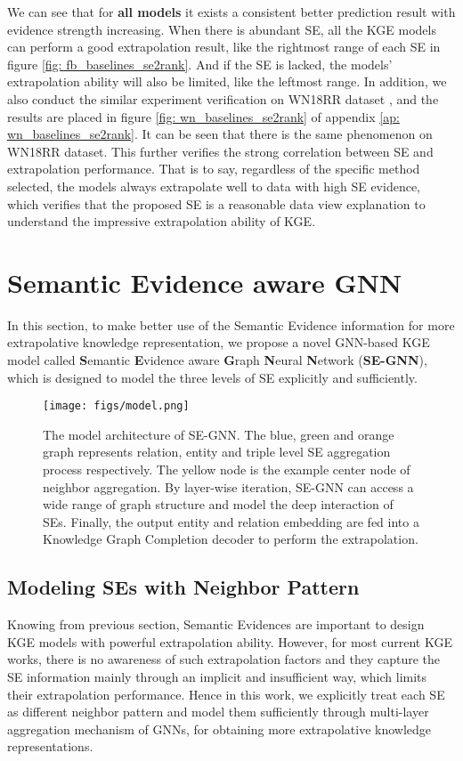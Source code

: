 \documentclass[letterpaper]{article} \usepackage{aaai22}  \usepackage{times}  \usepackage{helvet}  \usepackage{courier}  \usepackage[hyphens]{url}  \usepackage{graphicx} \urlstyle{rm} \def\UrlFont{\rm}  \usepackage{natbib}  \usepackage{caption} \DeclareCaptionStyle{ruled}{labelfont=normalfont,labelsep=colon,strut=off} \frenchspacing  \setlength{\pdfpagewidth}{8.5in}  \setlength{\pdfpageheight}{11in}  \usepackage{algorithm}
\begin{document}
We can see that for \textbf{all models} it exists a consistent better prediction result with evidence strength increasing. When there is abundant SE, all the KGE models can perform a good extrapolation result, like the rightmost range of each SE in figure \ref{fig: fb_baselines_se2rank}. And if the SE is lacked, the models' extrapolation ability will also be limited, like the leftmost range. 
In addition, we also conduct the similar experiment verification on WN18RR dataset \cite{AAAI_2018_Dettmers_ConvE_WN18RR}, and the results are placed in figure \ref{fig: wn_baselines_se2rank} of appendix \ref{ap: wn_baselines_se2rank}. It can be seen that there is the same phenomenon on WN18RR dataset. 
This further verifies the strong correlation between SE and extrapolation performance. That is to say, regardless of the specific method selected, the models always extrapolate well to data with high SE evidence, which verifies that the proposed SE is a reasonable data view explanation to understand the impressive extrapolation ability of KGE.

\section{Semantic Evidence aware GNN}
In this section, to make better use of the Semantic Evidence information for more extrapolative knowledge representation, we propose a novel GNN-based KGE model called \textbf{S}emantic \textbf{E}vidence aware \textbf{G}raph \textbf{N}eural \textbf{N}etwork (\textbf{SE-GNN}), which is designed to model the three levels of SE explicitly and sufficiently. 

\begin{figure}[t]
    \centering 
    \texttt{[image: figs/model.png]}
    \caption{The model architecture of SE-GNN. The blue, green and orange graph represents relation, entity and triple level SE aggregation process respectively. The yellow node is the example center node of neighbor aggregation. 
    By layer-wise iteration, SE-GNN can access a wide range of graph structure and model the deep interaction of SEs. 
    Finally, the output entity and relation embedding are fed into a Knowledge Graph Completion decoder to perform the extrapolation. } 
    \label{fig: model}
\end{figure}

\subsection{Modeling SEs with Neighbor Pattern}
\label{sec: modeling_se}
Knowing from previous section, Semantic Evidences are important to design KGE models with powerful extrapolation ability. 
However, for most current KGE works, there is no awareness of such extrapolation factors and they capture the SE information mainly through an implicit and insufficient way, which limits their extrapolation performance.
Hence in this work, we explicitly treat each SE as different neighbor pattern and model them sufficiently through multi-layer aggregation mechanism of GNNs, for obtaining more extrapolative knowledge representations.
\end{document}
